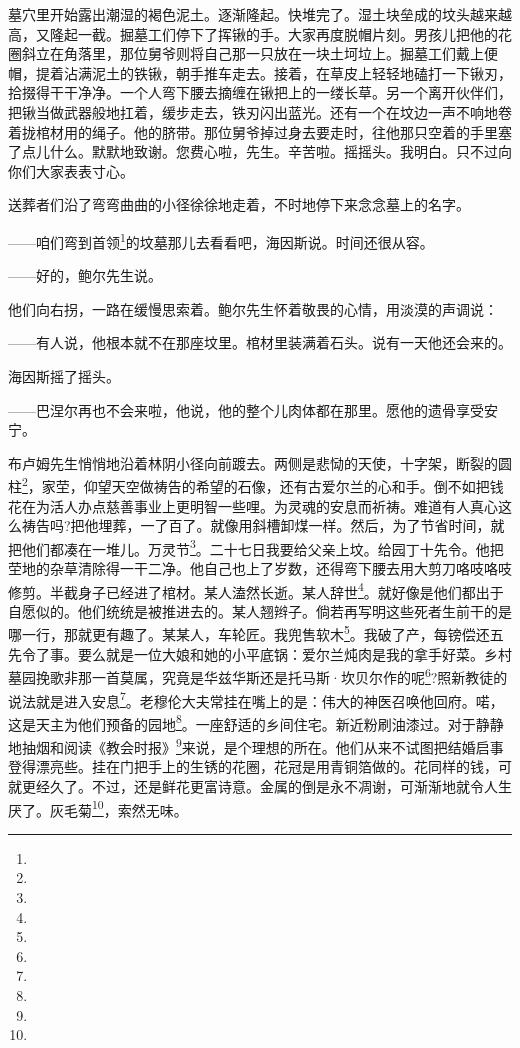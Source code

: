 \par 墓穴里开始露出潮湿的褐色泥土。逐渐隆起。快堆完了。湿土块垒成的坟头越来越高，又隆起一截。掘墓工们停下了挥锹的手。大家再度脱帽片刻。男孩儿把他的花圈斜立在角落里，那位舅爷则将自己那一只放在一块土坷垃上。掘墓工们戴上便帽，提着沾满泥土的铁锹，朝手推车走去。接着，在草皮上轻轻地磕打一下锹刃，拾掇得干干净净。一个人弯下腰去摘缠在锹把上的一缕长草。另一个离开伙伴们，把锹当做武器般地扛着，缓步走去，铁刃闪出蓝光。还有一个在坟边一声不响地卷着拢棺材用的绳子。他的脐带。那位舅爷掉过身去要走时，往他那只空着的手里塞了点儿什么。默默地致谢。您费心啦，先生。辛苦啦。摇摇头。我明白。只不过向你们大家表表寸心。
\par 送葬者们沿了弯弯曲曲的小径徐徐地走着，不时地停下来念念墓上的名字。
\par ——咱们弯到首领\footnote{}的坟墓那儿去看看吧，海因斯说。时间还很从容。
\par ——好的，鲍尔先生说。
\par 他们向右拐，一路在缓慢思索着。鲍尔先生怀着敬畏的心情，用淡漠的声调说：
\par ——有人说，他根本就不在那座坟里。棺材里装满着石头。说有一天他还会来的。
\par 海因斯摇了摇头。
\par ——巴涅尔再也不会来啦，他说，他的整个儿肉体都在那里。愿他的遗骨享受安宁。
\par 布卢姆先生悄悄地沿着林阴小径向前踱去。两侧是悲恸的天使，十字架，断裂的圆柱\footnote{}，家茔，仰望天空做祷告的希望的石像，还有古爱尔兰的心和手。倒不如把钱花在为活人办点慈善事业上更明智一些哩。为灵魂的安息而祈祷。难道有人真心这么祷告吗?把他埋葬，一了百了。就像用斜槽卸煤一样。然后，为了节省时间，就把他们都凑在一堆儿。万灵节\footnote{}。二十七日我要给父亲上坟。给园丁十先令。他把茔地的杂草清除得一干二净。他自己也上了岁数，还得弯下腰去用大剪刀咯吱咯吱修剪。半截身子已经进了棺材。某人溘然长逝。某人辞世\footnote{}。就好像是他们都出于自愿似的。他们统统是被推进去的。某人翘辫子。倘若再写明这些死者生前干的是哪一行，那就更有趣了。某某人，车轮匠。我兜售软木\footnote{}。我破了产，每镑偿还五先令了事。要么就是一位大娘和她的小平底锅：爱尔兰炖肉是我的拿手好菜。乡村墓园挽歌非那一首莫属，究竟是华兹华斯还是托马斯·坎贝尔作的呢\footnote{}?照新教徒的说法就是进入安息\footnote{}。老穆伦大夫常挂在嘴上的是：伟大的神医召唤他回府。喏，这是天主为他们预备的园地\footnote{}。一座舒适的乡间住宅。新近粉刷油漆过。对于静静地抽烟和阅读《教会时报》\footnote{}来说，是个理想的所在。他们从来不试图把结婚启事登得漂亮些。挂在门把手上的生锈的花圈，花冠是用青铜箔做的。花同样的钱，可就更经久了。不过，还是鲜花更富诗意。金属的倒是永不凋谢，可渐渐地就令人生厌了。灰毛菊\footnote{}，索然无味。
